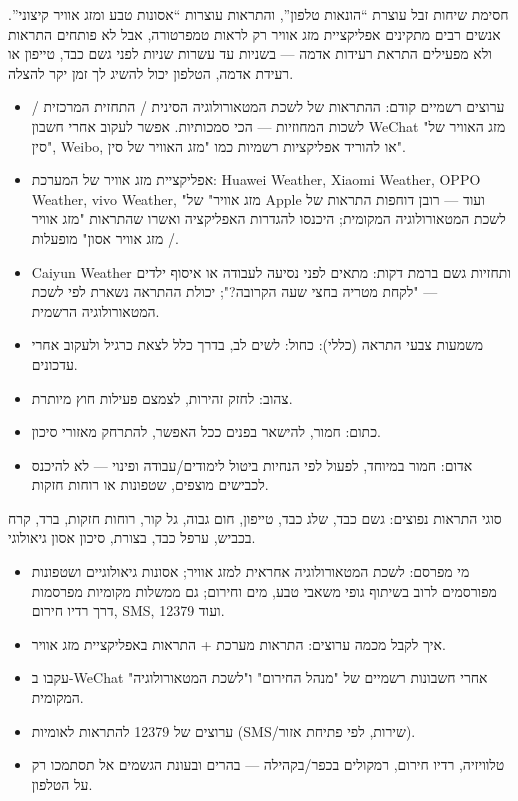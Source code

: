 
חסימת שיחות זבל עוצרת “הונאות טלפון”, והתראות עוצרות “אסונות טבע ומזג אוויר קיצוני”. אנשים רבים מתקינים אפליקציית מזג אוויר רק לראות טמפרטורה, אבל לא פותחים התראות ולא מפעילים התראת רעידות אדמה — בשניות עד עשרות שניות לפני גשם כבד, טייפון או רעידת אדמה, הטלפון יכול להשיג לך זמן יקר להצלה.


\begin{itemize}
  \item ערוצים רשמיים קודם: ההתראות של לשכת המטאורולוגיה הסינית / התחזית המרכזית / לשכות המחוזיות — הכי סמכותיות. אפשר לעקוב אחרי חשבון WeChat "מזג האוויר של סין", Weibo, או להוריד אפליקציות רשמיות כמו "מזג האוויר של סין".
  \item אפליקציית מזג אוויר של המערכת: Huawei Weather, Xiaomi Weather, OPPO Weather, vivo Weather, "מזג אוויר" של Apple ועוד — רובן דוחפות התראות של לשכת המטאורולוגיה המקומית; היכנסו להגדרות האפליקציה ואשרו שהתראות "מזג אוויר / מזג אוויר אסון" מופעלות.
  \item Caiyun Weather ותחזיות גשם ברמת דקות: מתאים לפני נסיעה לעבודה או איסוף ילדים — "לקחת מטריה בחצי שעה הקרובה?"; יכולת ההתראה נשארת לפי לשכת המטאורולוגיה הרשמית.
  \item משמעות צבעי התראה (כללי): כחול: לשים לב, בדרך כלל לצאת כרגיל ולעקוב אחרי עדכונים.
  \item צהוב: לחזק זהירות, לצמצם פעילות חוץ מיותרת.
  \item כתום: חמור, להישאר בפנים ככל האפשר, להתרחק מאזורי סיכון.
  \item אדום: חמור במיוחד, לפעול לפי הנחיות ביטול לימודים/עבודה ופינוי — לא להיכנס לכבישים מוצפים, שטפונות או רוחות חזקות.
\end{itemize}

סוגי התראות נפוצים: גשם כבד, שלג כבד, טייפון, חום גבוה, גל קור, רוחות חזקות, ברד, קרח בכביש, ערפל כבד, בצורת, סיכון אסון גיאולוגי.


\begin{itemize}
  \item מי מפרסם: לשכת המטאורולוגיה אחראית למזג אוויר; אסונות גיאולוגיים ושטפונות מפורסמים לרוב בשיתוף גופי משאבי טבע, מים וחירום; גם ממשלות מקומיות מפרסמות דרך רדיו חירום, SMS, 12379 ועוד.
  \item איך לקבל מכמה ערוצים: התראות מערכת + התראות באפליקציית מזג אוויר.
  \item עקבו ב-WeChat אחרי חשבונות רשמיים של "מנהל החירום" ו"לשכת המטאורולוגיה" המקומית.
  \item ערוצים של 12379 להתראות לאומיות (SMS/שירות, לפי פתיחת אזור).
  \item טלוויזיה, רדיו חירום, רמקולים בכפר/בקהילה — בהרים ובעונת הגשמים אל תסתמכו רק על הטלפון.
\end{itemize}


